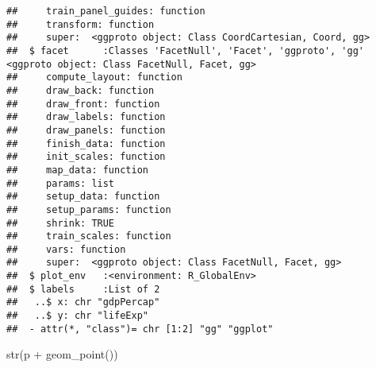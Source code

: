 \documentclass[
]{article}
\newenvironment{Shaded}{\begin{snugshade}}{\end{snugshade}}
\newcommand{\FunctionTok}[1]{\textcolor[rgb]{0.00,0.00,0.00}{#1}}
\newcommand{\NormalTok}[1]{#1}
\newcommand{\SpecialCharTok}[1]{\textcolor[rgb]{0.00,0.00,0.00}{#1}}
\begin{document}
\begin{verbatim}
##     train_panel_guides: function
##     transform: function
##     super:  <ggproto object: Class CoordCartesian, Coord, gg> 
##  $ facet      :Classes 'FacetNull', 'Facet', 'ggproto', 'gg' <ggproto object: Class FacetNull, Facet, gg>
##     compute_layout: function
##     draw_back: function
##     draw_front: function
##     draw_labels: function
##     draw_panels: function
##     finish_data: function
##     init_scales: function
##     map_data: function
##     params: list
##     setup_data: function
##     setup_params: function
##     shrink: TRUE
##     train_scales: function
##     vars: function
##     super:  <ggproto object: Class FacetNull, Facet, gg> 
##  $ plot_env   :<environment: R_GlobalEnv> 
##  $ labels     :List of 2
##   ..$ x: chr "gdpPercap"
##   ..$ y: chr "lifeExp"
##  - attr(*, "class")= chr [1:2] "gg" "ggplot"
\end{verbatim}

\begin{Shaded}
\begin{Highlighting}[]
\FunctionTok{str}\NormalTok{(p }\SpecialCharTok{+} \FunctionTok{geom\_point}\NormalTok{())}
\end{Highlighting}
\end{Shaded}
\end{document}
